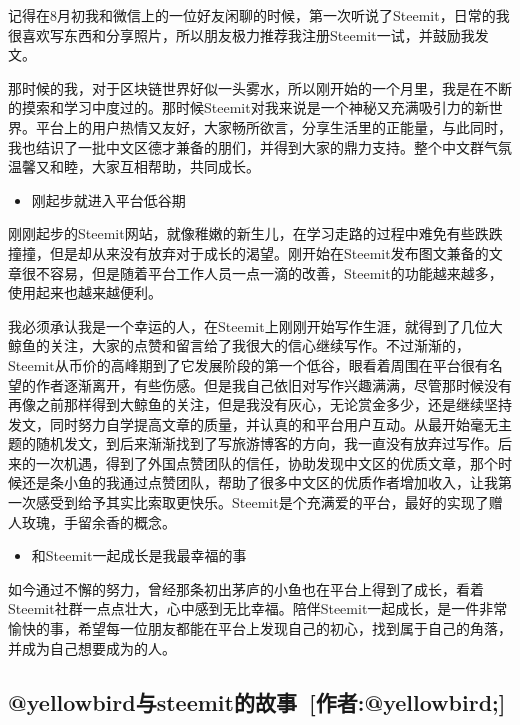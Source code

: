 \documentclass[]{ctexbook}
\providecommand{\tightlist}{%
  \setlength{\itemsep}{0pt}\setlength{\parskip}{0pt}}
\begin{document}
记得在8月初我和微信上的一位好友闲聊的时候，第一次听说了Steemit，日常的我很喜欢写东西和分享照片，所以朋友极力推荐我注册Steemit一试，并鼓励我发文。

那时候的我，对于区块链世界好似一头雾水，所以刚开始的一个月里，我是在不断的摸索和学习中度过的。那时候Steemit对我来说是一个神秘又充满吸引力的新世界。平台上的用户热情又友好，大家畅所欲言，分享生活里的正能量，与此同时，我也结识了一批中文区德才兼备的朋们，并得到大家的鼎力支持。整个中文群气氛温馨又和睦，大家互相帮助，共同成长。

\begin{itemize}
\tightlist
\item
  刚起步就进入平台低谷期
\end{itemize}

刚刚起步的Steemit网站，就像稚嫩的新生儿，在学习走路的过程中难免有些跌跌撞撞，但是却从来没有放弃对于成长的渴望。刚开始在Steemit发布图文兼备的文章很不容易，但是随着平台工作人员一点一滴的改善，Steemit的功能越来越多，使用起来也越来越便利。

我必须承认我是一个幸运的人，在Steemit上刚刚开始写作生涯，就得到了几位大鲸鱼的关注，大家的点赞和留言给了我很大的信心继续写作。不过渐渐的，Steemit从币价的高峰期到了它发展阶段的第一个低谷，眼看着周围在平台很有名望的作者逐渐离开，有些伤感。但是我自己依旧对写作兴趣满满，尽管那时候没有再像之前那样得到大鲸鱼的关注，但是我没有灰心，无论赏金多少，还是继续坚持发文，同时努力自学提高文章的质量，并认真的和平台用户互动。从最开始毫无主题的随机发文，到后来渐渐找到了写旅游博客的方向，我一直没有放弃过写作。后来的一次机遇，得到了外国点赞团队的信任，协助发现中文区的优质文章，那个时候还是条小鱼的我通过点赞团队，帮助了很多中文区的优质作者增加收入，让我第一次感受到给予其实比索取更快乐。Steemit是个充满爱的平台，最好的实现了赠人玫瑰，手留余香的概念。

\begin{itemize}
\tightlist
\item
  和Steemit一起成长是我最幸福的事
\end{itemize}

如今通过不懈的努力，曾经那条初出茅庐的小鱼也在平台上得到了成长，看着Steemit社群一点点壮大，心中感到无比幸福。陪伴Steemit一起成长，是一件非常愉快的事，希望每一位朋友都能在平台上发现自己的初心，找到属于自己的角落，并成为自己想要成为的人。

\hypertarget{yellowbirdsteemityellowbird}{%
\subsection{@yellowbird与steemit的故事~{[}作者:@yellowbird;{]}}\label{yellowbirdsteemityellowbird}}
\end{document}

